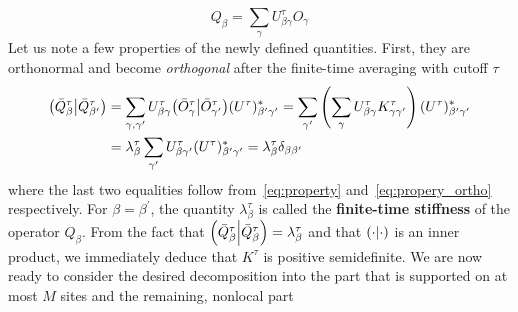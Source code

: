 \begin{equation}
  Q_{\beta} = \sum_{\gamma} U^{\tau}_{\beta \gamma} O_{\gamma}
  \label{eq:liom}
\end{equation}
Let us note a few properties of the newly defined quantities. First, they are orthonormal
and become \textit{orthogonal} after the finite-time averaging with cutoff \(\tau\)
\begin{align}
  \left(\bar{Q} ^{\tau}_\beta \middle| \bar{Q} ^{\tau}_{\beta^{\prime}}\right) & = \sum_{\gamma,\gamma^{\prime}} U^{\tau}_{\beta\gamma} {\left(\bar{O}_{\gamma}^{\tau} \middle| \bar{O}_{\gamma^{\prime}}^{\tau}\right)} (U^{\tau})_{\beta^{\prime}\gamma^{\prime}}^{\ast}
  = \sum_{\gamma^{\prime}} \left(\sum_{\gamma}U^{\tau}_{\beta\gamma} K_{\gamma\gamma^{\prime}}^{\tau}\right)  (U^{\tau})_{\beta^{\prime}{\gamma^{\prime}}}^{\ast}\nonumber                                                                               \\
                                                               & = \lambda^{\tau}_{\beta} \sum_{\gamma^{\prime}} U^{\tau}_{\beta\gamma^{\prime}} (U^{\tau})_{\beta^{\prime}\gamma^{\prime}}^{\ast} = \lambda^{\tau}_{\beta} \delta_{\beta\beta^{\prime}}
\end{align}
where the last two equalities follow from~\eqref{eq:property} and~\eqref{eq:propery_ortho} respectively.
For \(\beta =\beta ^{\prime} \), the quantity \(\lambda^{\tau}_{\beta}\) is called the \textbf{finite-time stiffness} of the operator \(Q_{\beta}\).
From the fact that \(\left(\bar{Q}^{\tau}_{\beta} \middle| \bar{Q}^{\tau}_{\beta}\right) = \lambda^{\tau}_{\beta}\) and that \(\left(\cdot \middle| \cdot\right)\) is an inner product,
we immediately deduce that \(K^{\tau}\) is positive semidefinite.
We are now ready to consider the desired decomposition into the part that is supported on at most \(M\) sites and the remaining, nonlocal part
